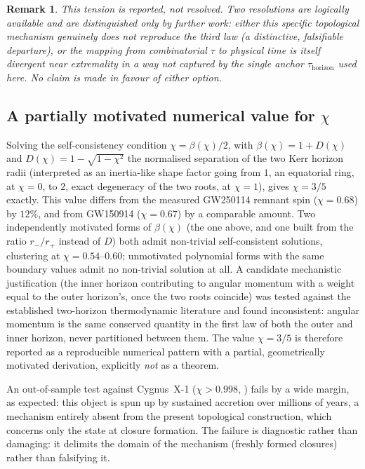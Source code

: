 \documentclass[12pt,a4paper]{article}
\newtheorem{remark}[theorem]{Remark}
\newcommand{\chif}{\chi}
\begin{document}
\begin{remark}
This tension is reported, not resolved. Two resolutions are logically
available and are distinguished only by further work: either this
specific topological mechanism genuinely does not reproduce the
third law (a distinctive, falsifiable departure), or the mapping
from combinatorial $\tau$ to physical time is itself divergent near
extremality in a way not captured by the single anchor
$\tau_{\mathrm{horizon}}$ used here. No claim is made in favour of
either option.
\end{remark}

\subsection{\texorpdfstring{A partially motivated numerical value for $\chif$}{A partially motivated numerical value for chi}}

\begin{conjecturebox}
Solving the self-consistency condition $\chif=\beta(\chif)/2$, with
$\beta(\chif)=1+D(\chif)$ and $D(\chif)=1-\sqrt{1-\chif^2}$ the
normalised separation of the two Kerr horizon radii (interpreted as
an inertia-like shape factor going from $1$, an equatorial ring, at
$\chif=0$, to $2$, exact degeneracy of the two roots, at
$\chif=1$), gives $\chif=3/5$ exactly. This value differs from the
measured GW250114 remnant spin ($\chif=0.68$) by $12\%$, and from
GW150914 ($\chif=0.67$) by a comparable amount. Two independently
motivated forms of $\beta(\chif)$ (the one above, and one built from
the ratio $r_-/r_+$ instead of $D$) both admit non-trivial
self-consistent solutions, clustering at $\chif=0.54$--$0.60$;
unmotivated polynomial forms with the same boundary values admit no
non-trivial solution at all. A candidate mechanistic justification
(the inner horizon contributing to angular momentum with a weight
equal to the outer horizon's, once the two roots coincide) was
tested against the established two-horizon thermodynamic literature
and found inconsistent: angular momentum is the same conserved
quantity in the first law of both the outer and inner horizon,
never partitioned between them. The value $\chif=3/5$ is therefore
reported as a reproducible numerical pattern with a partial,
geometrically motivated derivation, explicitly \emph{not} as a
theorem.
\end{conjecturebox}

An out-of-sample test against Cygnus~X-1 ($\chif>0.998$,
\citep{Zhao2021}) fails by a wide margin, as expected: this object
is spun up by sustained accretion over millions of years, a
mechanism entirely absent from the present topological
construction, which concerns only the state at closure formation.
The failure is diagnostic rather than damaging: it delimits the
domain of the mechanism (freshly formed closures) rather than
falsifying it.
\end{document}
